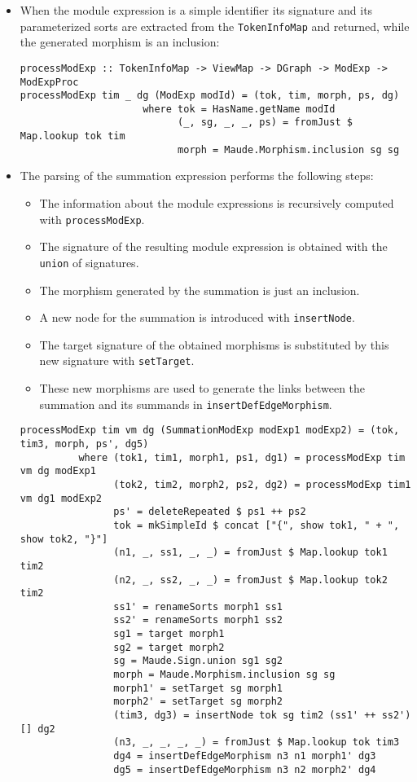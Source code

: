 \begin{itemize}
\item When the module expression is a simple identifier its signature
and its parameterized sorts are extracted from the \verb"TokenInfoMap"
and returned, while the generated morphism is an inclusion:

{\codesize
\begin{verbatim}
processModExp :: TokenInfoMap -> ViewMap -> DGraph -> ModExp -> ModExpProc
processModExp tim _ dg (ModExp modId) = (tok, tim, morph, ps, dg)
                     where tok = HasName.getName modId
                           (_, sg, _, _, ps) = fromJust $ Map.lookup tok tim
                           morph = Maude.Morphism.inclusion sg sg
\end{verbatim}
}

\item The parsing of the summation expression performs the following
steps:

\begin{itemize}
\item The information about the module expressions is recursively
computed with \verb"processModExp".
\item The signature of the resulting module expression is obtained
with the \verb"union" of signatures.
\item The morphism generated by the summation is just an inclusion.
\item A new node for the summation is introduced with \verb"insertNode".
\item The target signature of the obtained morphisms is substituted
by this new signature with \verb"setTarget".
\item These new morphisms are used to generate the links between the
summation and its summands in \verb"insertDefEdgeMorphism".
\end{itemize}

{\codesize
\begin{verbatim}
processModExp tim vm dg (SummationModExp modExp1 modExp2) = (tok, tim3, morph, ps', dg5)
          where (tok1, tim1, morph1, ps1, dg1) = processModExp tim vm dg modExp1
                (tok2, tim2, morph2, ps2, dg2) = processModExp tim1 vm dg1 modExp2
                ps' = deleteRepeated $ ps1 ++ ps2
                tok = mkSimpleId $ concat ["{", show tok1, " + ", show tok2, "}"]
                (n1, _, ss1, _, _) = fromJust $ Map.lookup tok1 tim2
                (n2, _, ss2, _, _) = fromJust $ Map.lookup tok2 tim2
                ss1' = renameSorts morph1 ss1
                ss2' = renameSorts morph1 ss2
                sg1 = target morph1
                sg2 = target morph2
                sg = Maude.Sign.union sg1 sg2
                morph = Maude.Morphism.inclusion sg sg
                morph1' = setTarget sg morph1
                morph2' = setTarget sg morph2
                (tim3, dg3) = insertNode tok sg tim2 (ss1' ++ ss2') [] dg2
                (n3, _, _, _, _) = fromJust $ Map.lookup tok tim3
                dg4 = insertDefEdgeMorphism n3 n1 morph1' dg3
                dg5 = insertDefEdgeMorphism n3 n2 morph2' dg4
\end{verbatim}
}


\end{itemize}
